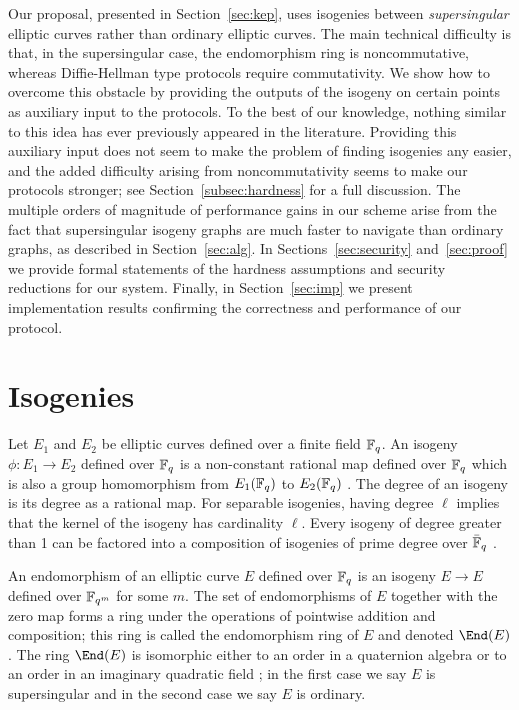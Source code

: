 Our proposal, presented in Section~\ref{sec:kep}, uses isogenies
between \emph{supersingular} elliptic curves rather than ordinary
elliptic curves. The main technical difficulty is that, in the
supersingular case, the endomorphism ring is noncommutative, whereas
Diffie-Hellman type protocols require commutativity. We show how to
overcome this obstacle by providing the outputs of the isogeny on
certain points as auxiliary input to the protocols. To the best of our
knowledge, nothing similar to this idea has ever previously appeared
in the literature. Providing this auxiliary input does not seem to
make the problem of finding isogenies any easier, and the added
difficulty arising from noncommutativity seems to make our protocols
stronger; see Section~\ref{subsec:hardness} for a full discussion. The
multiple orders of magnitude of performance gains in our scheme arise
from the fact that supersingular isogeny graphs are much faster to
navigate than ordinary graphs, as described in
Section~\ref{sec:alg}. In Sections~\ref{sec:security}
and~\ref{sec:proof} we provide formal statements of the hardness
assumptions and security reductions for our system. Finally, in
Section~\ref{sec:imp} we present implementation results confirming the
correctness and performance of our protocol.


\section{Isogenies}\label{isogenies}
Let $E_1$ and $E_2$ be elliptic curves defined over a finite field
${\mathbb{F}}_q$.
An isogeny $\phi: E_1 \rightarrow E_2$ defined over ${\mathbb{F}}_q$ is a
non-constant rational map defined over ${\mathbb{F}}_q$ which is also a group
homomorphism from $E_1({\mathbb{F}}_q)$ to $E_2({\mathbb{F}}_q)$ \cite[III.4]{Sil}. The
degree of an isogeny is its degree as a rational map.  For separable
isogenies, having degree $\ell$ implies that the kernel of the
isogeny has cardinality $\ell$.
Every isogeny of degree greater than 1 can be factored into a
composition of isogenies of prime degree over $\bar{{\mathbb{F}}}_q$
\cite{cryptoeprint:2006:291}.

An endomorphism of an elliptic curve $E$ defined over ${\mathbb{F}}_q$ is an
isogeny $E \rightarrow E$ defined over ${\mathbb{F}}_{q^m}$ for some $m$. The
set of endomorphisms of $E$ together with the zero map forms a ring
under the operations of pointwise addition and composition; this ring
is called the endomorphism ring of $E$ and denoted $\End(E)$. The ring
$\End(E)$ is isomorphic either to an order in a quaternion algebra or
to an order in an imaginary quadratic field \cite[V.3.1]{Sil}; in the
first case we say $E$ is supersingular and in the second case we say
$E$ is ordinary.

